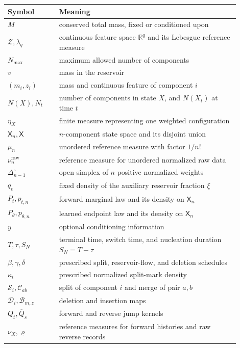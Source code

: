 \documentclass[10pt]{article}
\theoremstyle{definition}
\theoremstyle{remark}
\newcommand{\R}{\mathbb{R}}
\newcommand{\state}{\mathsf{X}}
\newcommand{\splitmap}{\mathcal{S}}
\newcommand{\mergemap}{\mathcal{C}}
\newcommand{\deathmap}{\mathcal{D}}
\newcommand{\birthmap}{\mathcal{B}}
\begin{document}
\begin{center}
\small
\begin{tabular}{>{\raggedright\arraybackslash}p{0.20\linewidth}p{0.70\linewidth}}
\toprule
Symbol & Meaning \\
\midrule
$M$ & conserved total mass, fixed or conditioned upon \\
$\mathcal Z,\lambda_q$ & continuous feature space $\R^q$ and its Lebesgue reference measure \\
$N_{\max}$ & maximum allowed number of components \\
$v$ & mass in the reservoir \\
$(m_i,z_i)$ & mass and continuous feature of component $i$ \\
$N(X),N_t$ & number of components in state $X$, and $N(X_t)$ at time $t$ \\
$\eta_X$ & finite measure representing one weighted configuration \\
$\state_n,\state$ & $n$-component state space and its disjoint union \\
$\mu_n$ & unordered reference measure with factor $1/n!$ \\
$\nu_n^{\mathrm{raw}}$ & reference measure for unordered normalized raw data \\
$\Delta_{n-1}^{\circ}$ & open simplex of $n$ positive normalized weights \\
$q_\epsilon$ & fixed density of the auxiliary reservoir fraction $\xi$ \\
$P_t,p_{t,n}$ & forward marginal law and its density on $\state_n$ \\
$P_\theta,p_{\theta,n}$ & learned endpoint law and its density on $\state_n$ \\
$y$ & optional conditioning information \\
$T,\tau,S_N$ & terminal time, switch time, and nucleation duration $S_N=T-\tau$ \\
$\beta,\gamma,\delta$ & prescribed split, reservoir-flow, and deletion schedules \\
$\kappa_t$ & prescribed normalized split-mark density \\
$\splitmap_i,\mergemap_{ab}$ & split of component $i$ and merge of pair $a,b$ \\
$\deathmap_i,\birthmap_{m,z}$ & deletion and insertion maps \\
$Q_t,\overline Q_s$ & forward and reverse jump kernels \\
$\nu_X,\varrho$ & reference measures for forward histories and raw reverse records \\

\end{tabular}
\end{center}
\end{document}
